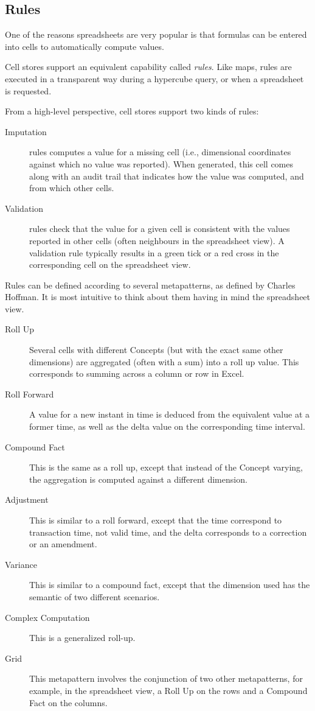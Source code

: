 \documentclass{vldb}
\begin{document}
\subsection{Rules}

One of the reasons spreadsheets are very popular is that formulas can be entered into cells to automatically compute values.

Cell stores support an equivalent capability called \emph{rules}. Like maps, rules are executed in a transparent way during a hypercube query, or when a spreadsheet is requested.

From a high-level perspective, cell stores support two kinds of rules:

\begin{description}
\item[Imputation] rules computes a value for a missing cell (i.e., dimensional coordinates against which no value was reported). When generated, this cell comes along with an audit trail that indicates how the value was computed, and from which other cells.
\item[Validation] rules check that the value for a given cell is consistent with the values reported in other cells (often neighbours in the spreadsheet view). A validation rule typically results in a green tick or a red cross in the corresponding cell on the spreadsheet view.
\end{description}

Rules can be defined according to several metapatterns, as defined by Charles Hoffman. It is most intuitive to think about them having in mind the spreadsheet view.

\begin{description}
\item [Roll Up] Several cells with different Concepts (but with the exact same other dimensions) are aggregated (often with a sum) into a roll up value. This corresponds to summing across a column or row in Excel.
\item [Roll Forward] A value for a new instant in time is deduced from the equivalent value at a former time, as well as the delta value on the corresponding time interval.
\item [Compound Fact] This is the same as a roll up, except that instead of the Concept varying, the aggregation is computed against a different dimension.
\item [Adjustment] This is similar to a roll forward, except that the time correspond to transaction time, not valid time, and the delta corresponds to a correction or an amendment.
\item [Variance] This is similar to a compound fact, except that the dimension used has the semantic of two different scenarios.
\item [Complex Computation] This is a generalized roll-up.
\item [Grid] This metapattern involves the conjunction of two other metapatterns, for example, in the spreadsheet view, a Roll Up on the rows and a Compound Fact on the columns.
\end{description}
\end{document}
